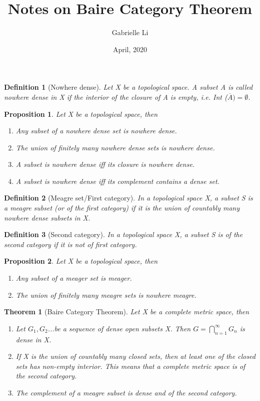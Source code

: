 \documentclass{article}
\title{Notes on Baire Category Theorem}
\author{Gabrielle Li}
\date{April, 2020}
\newtheorem*{theorem}{Theorem}
\newtheorem*{definition}{Definition}
\newtheorem*{proposition}{Proposition}
\begin{document}
\maketitle

\begin{definition}[Nowhere dense]
Let X be a topological space. A subset A is called nowhere dense in X if the interior of the closure of A is empty, i.e. Int ($\overline{A}) = \emptyset$.
\end{definition}

\begin{proposition} Let X be a topological space, then
\begin{enumerate}
    \item Any subset of a nowhere dense set is nowhere dense.
    \item The union of finitely many nowhere dense sets is nowhere dense.
    \item A subset is nowhere dense iff its closure is nowhere dense.
    \item A subset is nowhere dense iff its complement contains a dense set.
\end{enumerate}
\end{proposition}

\begin{definition}[Meagre set/First category]
In a topological space X, a subset S is a meagre subset (or of the first category) if it is the union of countably many nowhere dense subsets in X.
\end{definition}

\begin{definition}[Second category]
In a topological space X, a subset S is of the second category if it is not of first category.
\end{definition}

\begin{proposition} Let X be a topological space, then
\begin{enumerate}
    \item Any subset of a meager set is meager.
    \item The union of finitely many meagre sets is nowhere meagre.
\end{enumerate}
\end{proposition}

\begin{theorem}[Baire Category Theorem] Let X be a complete metric space, then
\begin{enumerate}
\item Let $G_{1}, G_{2}$...be a sequence of dense open subsets X. Then $G = \bigcap^{\infty}_{n=1}G_{n}$ is dense in X.
\item If X is the union of countably many closed sets, then at least one of the closed sets has non-empty interior. This means that a complete metric space is of the second category.
\item The complement of a meagre subset is dense and of the second category.
\end{enumerate}
\end{theorem}
\end{document}
